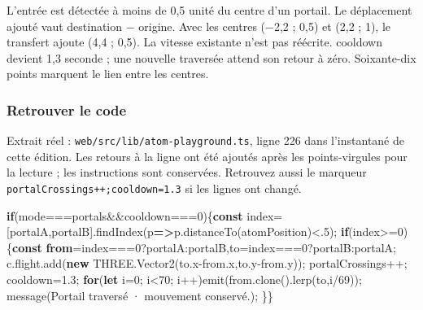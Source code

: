 \documentclass[
  canadien,
  11pt,
  letterpaper,
]{article}
\newenvironment{Shaded}{}{}
\newcommand{\AttributeTok}[1]{\textcolor[rgb]{0.49,0.56,0.16}{#1}}
\newcommand{\ControlFlowTok}[1]{\textcolor[rgb]{0.00,0.44,0.13}{\textbf{#1}}}
\newcommand{\DecValTok}[1]{\textcolor[rgb]{0.25,0.63,0.44}{#1}}
\newcommand{\FloatTok}[1]{\textcolor[rgb]{0.25,0.63,0.44}{#1}}
\newcommand{\FunctionTok}[1]{\textcolor[rgb]{0.02,0.16,0.49}{#1}}
\newcommand{\ImportTok}[1]{\textcolor[rgb]{0.00,0.50,0.00}{\textbf{#1}}}
\newcommand{\KeywordTok}[1]{\textcolor[rgb]{0.00,0.44,0.13}{\textbf{#1}}}
\newcommand{\NormalTok}[1]{#1}
\newcommand{\OperatorTok}[1]{\textcolor[rgb]{0.40,0.40,0.40}{#1}}
\newcommand{\StringTok}[1]{\textcolor[rgb]{0.25,0.44,0.63}{#1}}
\begin{document}
L'entrée est détectée à moins de 0,5 unité du centre d'un portail. Le
déplacement ajouté vaut destination − origine. Avec les centres (−2,2 ;
0,5) et (2,2 ; 1), le transfert ajoute (4,4 ; 0,5). La vitesse existante
n'est pas réécrite. cooldown devient 1,3 seconde ; une nouvelle
traversée attend son retour à zéro. Soixante-dix points marquent le lien
entre les centres.

\subsubsection{Retrouver le code}\label{retrouver-le-code-9}

Extrait réel : \texttt{web/src/lib/atom-playground.ts}, ligne 226 dans
l'instantané de cette édition. Les retours à la ligne ont été ajoutés
après les points-virgules pour la lecture ; les instructions sont
conservées. Retrouvez aussi le marqueur
\texttt{portalCrossings++;cooldown=1.3} si les lignes ont changé.

\begin{Shaded}
\begin{Highlighting}[]
\ControlFlowTok{if}\NormalTok{(mode}\OperatorTok{===}\StringTok{\textquotesingle{}portals\textquotesingle{}}\OperatorTok{\&\&}\NormalTok{cooldown}\OperatorTok{===}\DecValTok{0}\NormalTok{)\{}\KeywordTok{const}\NormalTok{ index}\OperatorTok{=}\NormalTok{[portalA}\OperatorTok{,}\NormalTok{portalB]}\OperatorTok{.}\FunctionTok{findIndex}\NormalTok{(p}\KeywordTok{=\textgreater{}}\NormalTok{p}\OperatorTok{.}\FunctionTok{distanceTo}\NormalTok{(atomPosition)}\OperatorTok{\textless{}.}\DecValTok{5}\NormalTok{)}\OperatorTok{;}
\ControlFlowTok{if}\NormalTok{(index}\OperatorTok{\textgreater{}=}\DecValTok{0}\NormalTok{)\{}\KeywordTok{const} \ImportTok{from}\OperatorTok{=}\NormalTok{index}\OperatorTok{===}\DecValTok{0}\OperatorTok{?}\NormalTok{portalA}\OperatorTok{:}\NormalTok{portalB}\OperatorTok{,}\NormalTok{to}\OperatorTok{=}\NormalTok{index}\OperatorTok{===}\DecValTok{0}\OperatorTok{?}\NormalTok{portalB}\OperatorTok{:}\NormalTok{portalA}\OperatorTok{;}
\NormalTok{c}\OperatorTok{.}\AttributeTok{flight}\OperatorTok{.}\FunctionTok{add}\NormalTok{(}\KeywordTok{new}\NormalTok{ THREE}\OperatorTok{.}\FunctionTok{Vector2}\NormalTok{(to}\OperatorTok{.}\AttributeTok{x}\OperatorTok{{-}}\NormalTok{from}\OperatorTok{.}\AttributeTok{x}\OperatorTok{,}\NormalTok{to}\OperatorTok{.}\AttributeTok{y}\OperatorTok{{-}}\NormalTok{from}\OperatorTok{.}\AttributeTok{y}\NormalTok{))}\OperatorTok{;}
\NormalTok{portalCrossings}\OperatorTok{++;}
\NormalTok{cooldown}\OperatorTok{=}\FloatTok{1.3}\OperatorTok{;}
\ControlFlowTok{for}\NormalTok{(}\KeywordTok{let}\NormalTok{ i}\OperatorTok{=}\DecValTok{0}\OperatorTok{;}
\NormalTok{i}\OperatorTok{\textless{}}\DecValTok{70}\OperatorTok{;}
\NormalTok{i}\OperatorTok{++}\NormalTok{)}\FunctionTok{emit}\NormalTok{(from}\OperatorTok{.}\FunctionTok{clone}\NormalTok{()}\OperatorTok{.}\FunctionTok{lerp}\NormalTok{(to}\OperatorTok{,}\NormalTok{i}\OperatorTok{/}\DecValTok{69}\NormalTok{))}\OperatorTok{;}
\FunctionTok{message}\NormalTok{(}\StringTok{\textquotesingle{}Portail traversé · mouvement conservé.\textquotesingle{}}\NormalTok{)}\OperatorTok{;}
\NormalTok{\}\}}
\end{Highlighting}
\end{Shaded}
\end{document}

